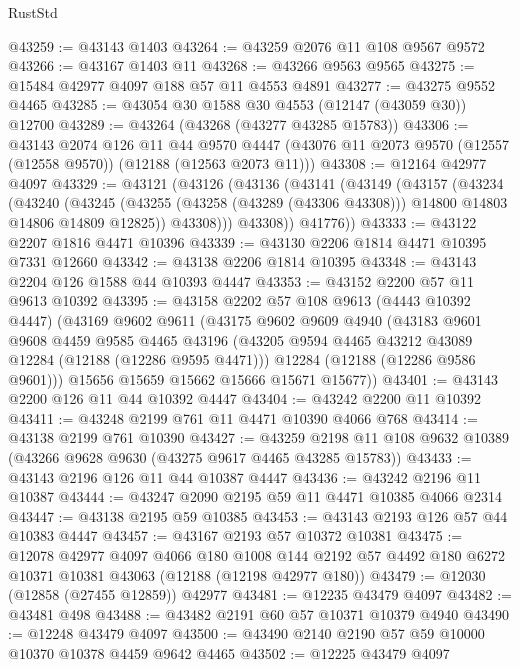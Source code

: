 \begin{lexlean}{RustStd}
\begin{coremodule}
@43259 := @43143 @1403
@43264 := @43259 @2076 @11 @108 @9567 @9572
@43266 := @43167 @1403 @11
@43268 := @43266 @9563 @9565
@43275 := @15484 @42977 @4097 @188 @57 @11 @4553 @4891
@43277 := @43275 @9552 @4465
@43285 := @43054 @30 @1588 @30 @4553 (@12147 (@43059 @30)) @12700
@43289 := @43264 (@43268 (@43277 @43285 @15783))
@43306 := @43143
    @2074
    @126
    @11
    @44
    @9570
    @4447
    (@43076 @11 @2073 @9570 (@12557 (@12558 @9570)) (@12188 (@12563 @2073 @11)))
@43308 := @12164 @42977 @4097
@43329 := @43121
    (@43126
      (@43136
        (@43141
          (@43149
            (@43157
              (@43234
                (@43240
                  (@43245
                    (@43255 (@43258 (@43289 (@43306 @43308))) @14800 @14803 @14806 @14809 @12825))
                  @43308)))
            @43308))
        @41776))
@43333 := @43122 @2207 @1816 @4471 @10396
@43339 := @43130 @2206 @1814 @4471 @10395 @7331 @12660
@43342 := @43138 @2206 @1814 @10395
@43348 := @43143 @2204 @126 @1588 @44 @10393 @4447
@43353 := @43152 @2200 @57 @11 @9613 @10392
@43395 := @43158
    @2202
    @57
    @108
    @9613
    (@4443 @10392 @4447)
    (@43169
      @9602
      @9611
      (@43175
        @9602
        @9609
        @4940
        (@43183
          @9601
          @9608
          @4459
          @9585
          @4465
          @43196
          (@43205 @9594 @4465 @43212 @43089 @12284 (@12188 (@12286 @9595 @4471)))
          @12284
          (@12188 (@12286 @9586 @9601)))
        @15656
        @15659
        @15662
        @15666
        @15671
        @15677))
@43401 := @43143 @2200 @126 @11 @44 @10392 @4447
@43404 := @43242 @2200 @11 @10392
@43411 := @43248 @2199 @761 @11 @4471 @10390 @4066 @768
@43414 := @43138 @2199 @761 @10390
@43427 := @43259 @2198 @11 @108 @9632 @10389 (@43266 @9628 @9630 (@43275 @9617 @4465 @43285 @15783))
@43433 := @43143 @2196 @126 @11 @44 @10387 @4447
@43436 := @43242 @2196 @11 @10387
@43444 := @43247 @2090 @2195 @59 @11 @4471 @10385 @4066 @2314
@43447 := @43138 @2195 @59 @10385
@43453 := @43143 @2193 @126 @57 @44 @10383 @4447
@43457 := @43167 @2193 @57 @10372 @10381
@43475 := @12078
    @42977
    @4097
    @4066
    @180
    @1008
    @144
    @2192
    @57
    @4492
    @180
    @6272
    @10371
    @10381
    @43063
    (@12188 (@12198 @42977 @180))
@43479 := @12030 (@12858 (@27455 @12859)) @42977
@43481 := @12235 @43479 @4097
@43482 := @43481 @498
@43488 := @43482 @2191 @60 @57 @10371 @10379 @4940
@43490 := @12248 @43479 @4097
@43500 := @43490 @2140 @2190 @57 @59 @10000 @10370 @10378 @4459 @9642 @4465
@43502 := @12225 @43479 @4097

\end{coremodule}
\end{lexlean}
